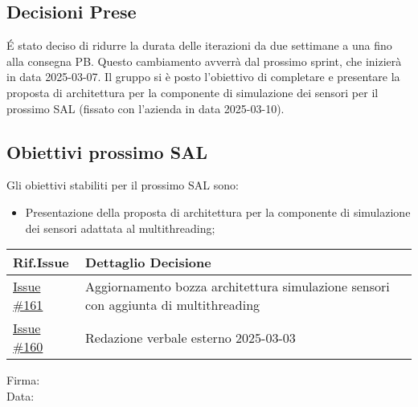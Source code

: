 \documentclass[10pt]{article}
\begin{document}
\subsection{Decisioni Prese}
\'E stato deciso di ridurre la durata delle iterazioni da due settimane a una fino alla consegna PB. Questo cambiamento avverrà dal prossimo sprint, che inizierà in data 2025-03-07. 
Il gruppo si è posto l'obiettivo di completare e presentare la proposta di architettura per la componente di simulazione dei sensori per il prossimo SAL (fissato con 
l'azienda in data 2025-03-10).

\subsection{Obiettivi prossimo SAL} 
Gli obiettivi stabiliti per il prossimo SAL sono:
    \begin{itemize}
            \item Presentazione della proposta di architettura per la componente di simulazione dei sensori adattata al multithreading;
    \end{itemize}
    \begin{center}
    \begin{tabular}{|>{\centering\arraybackslash}m{3cm}|>{\centering\arraybackslash}m{12cm}|}
	\hline
	\textbf{Rif.Issue} & \textbf{Dettaglio Decisione}\\
	    \hline
            \href{https://github.com/SevenBitsSwe/7BitsDocs/issues/161}{Issue \#161} & Aggiornamento bozza architettura simulazione sensori con aggiunta di multithreading\\
        \hline
            \href{https://github.com/SevenBitsSwe/7BitsDocs/issues/160}{Issue \#160} & Redazione verbale esterno 2025-03-03\\
        \hline
    \end{tabular}
    \end{center}

\vfill
\begin{minipage}{10cm}
Firma: \hrulefill \\
\vspace{2mm}
Data: \dotfill
\end{minipage}
\end{document}
